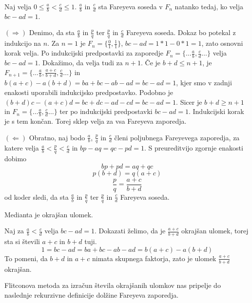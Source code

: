 \documentclass[mat1]{fmfdelo}
\begin{document}
\begin{trditev}
Naj velja \( 0 \leq \frac{a}{b} < \frac{c}{d} \leq 1\). $\frac{a}{b}$ in $\frac{c}{d}$ sta Fareyeva soseda v $F_n$ natanko tedaj, ko velja \(bc - ad = 1\).
\end{trditev}

\begin{dokaz}
$(\Rightarrow)$ Denimo, da sta $\frac{a}{b}$ in $\frac{p}{q}$ ter $\frac{p}{q}$ in $\frac{c}{d}$ Fareyeva soseda. Dokaz bo potekal z indukcijo na $n$.
Za $n=1$ je $F_n = \{\frac{0}{1}, \frac{1}{1}\}$, $bc - ad = 1*1 - 0*1 = 1$, zato osnovni korak velja.
Po indukcijski predpostavki za zaporedje \( F_n = \{\ldots \frac{a}{b}, \frac{c}{d} \ldots \} \) velja $bc - ad = 1$. Dokažimo, da velja tudi za $n+1$. Če je $b+d \leq n+1$, je \( F_{n+1} = \{\ldots \frac{a}{b}, \frac{a+c}{b+d}, \frac{c}{d} \ldots \} \) in $b(a + c) - a(b + d) = ba + bc - ab - ad = bc - ad = 1$, kjer smo v zadnji enakosti uporabili indukcijsko predpostavko. Podobno je $(b + d)c - (a + c)d = bc + dc - ad - cd = bc - ad = 1$. Sicer je $b+d \geq n+1$ in \( F_n = \{\ldots \frac{a}{b}, \frac{c}{d} \ldots \} \) ter po indukcijski predpostavki $bc - ad = 1$. Indukcijski korak je s tem končan. Torej sklep velja za vsa Fareyeva zaporedja.

$(\Leftarrow)$ Obratno, naj bodo $\frac{a}{b}$, $\frac{p}{q}$ in $\frac{c}{d}$ členi poljubnega Fareyevega zaporedja, za katere velja $\frac{a}{b} <\frac{p}{q} < \frac{c}{d}$ in $bp - aq = qc - pd = 1$. S preureditvijo zgornje enakosti dobimo
\[ bp + pd = aq + qc \]
\[ p(b + d) = q(a + c) \]
\[ \frac{p}{q} = \frac{a+c}{b+d} \]
od koder sledi, da sta $\frac{a}{b}$ in $\frac{p}{q}$ ter $\frac{p}{q}$ in $\frac{c}{d}$ Fareyeva soseda.
\end{dokaz}

\begin{lema}
Medianta je okrajšan ulomek.
\end{lema}

\begin{dokaz}
Naj za $\frac{a}{b} < \frac{c}{d}$ velja $bc - ad = 1$. Dokazati želimo, da je $\frac{a+c}{b+d}$ okrajšan ulomek, torej sta si števili $a+c$ in $b+d$ tuji. 
\[ 1 = bc - ad = ba + bc - ab - ad = b(a + c) - a(b + d) \]
To pomeni, da $b + d$ in $a + c$ nimata skupnega faktorja, zato je ulomek $\frac{a+c}{b+d}$ okrajšan.
\end{dokaz}

Flitconova metoda za izračun števila okrajšanih ulomkov nas pripelje do naslednje rekurzivne definicije dolžine Fareyeva zaporedja.
\end{document}
